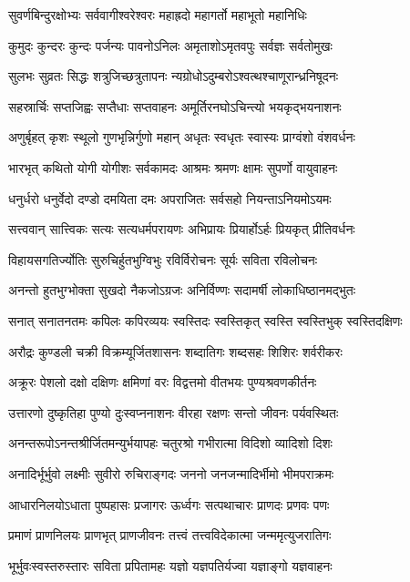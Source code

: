 \twolineshloka
{सुवर्णबिन्दुरक्षोभ्यः सर्ववागीश्वरेश्वरः}
{महाह्रदो महागर्तो महाभूतो महानिधिः}

\twolineshloka
{कुमुदः कुन्दरः कुन्दः पर्जन्यः पावनोऽनिलः}
{अमृताशोऽमृतवपुः सर्वज्ञः सर्वतोमुखः}

\twolineshloka
{सुलभः सुव्रतः सिद्धः शत्रुजिच्छत्रुतापनः}
{न्यग्रोधोऽदुम्बरोऽश्वत्थश्चाणूरान्ध्रनिषूदनः}

\twolineshloka
{सहस्रार्चिः सप्तजिह्वः सप्तैधाः सप्तवाहनः}
{अमूर्तिरनघोऽचिन्त्यो भयकृद्भयनाशनः}

\twolineshloka
{अणुर्बृहत् कृशः स्थूलो गुणभृन्निर्गुणो महान्}
{अधृतः स्वधृतः स्वास्यः प्राग्वंशो वंशवर्धनः}

\twolineshloka
{भारभृत् कथितो योगी योगीशः सर्वकामदः}
{आश्रमः श्रमणः क्षामः सुपर्णो वायुवाहनः}

\twolineshloka
{धनुर्धरो धनुर्वेदो दण्डो दमयिता दमः}
{अपराजितः सर्वसहो नियन्ताऽनियमोऽयमः}

\twolineshloka
{सत्त्ववान् सात्त्विकः सत्यः सत्यधर्मपरायणः}
{अभिप्रायः प्रियार्होऽर्हः प्रियकृत् प्रीतिवर्धनः}

\twolineshloka
{विहायसगतिर्ज्योतिः सुरुचिर्हुतभुग्विभुः}
{रविर्विरोचनः सूर्यः सविता रविलोचनः}

\twolineshloka
{अनन्तो हुतभुग्भोक्ता सुखदो नैकजोऽग्रजः}
{अनिर्विण्णः सदामर्षी लोकाधिष्ठानमद्भुतः}

\twolineshloka
{सनात् सनातनतमः कपिलः कपिरव्ययः}
{स्वस्तिदः स्वस्तिकृत् स्वस्ति स्वस्तिभुक् स्वस्तिदक्षिणः}

\twolineshloka
{अरौद्रः कुण्डली चक्री विक्रम्यूर्जितशासनः}
{शब्दातिगः शब्दसहः शिशिरः शर्वरीकरः}

\twolineshloka
{अक्रूरः पेशलो दक्षो दक्षिणः क्षमिणां वरः}
{विद्वत्तमो वीतभयः पुण्यश्रवणकीर्तनः}

\twolineshloka
{उत्तारणो दुष्कृतिहा पुण्यो दुःस्वप्ननाशनः}
{वीरहा रक्षणः सन्तो जीवनः पर्यवस्थितः}

\twolineshloka
{अनन्तरूपोऽनन्तश्रीर्जितमन्युर्भयापहः}
{चतुरश्रो गभीरात्मा विदिशो व्यादिशो दिशः}

\twolineshloka
{अनादिर्भूर्भुवो लक्ष्मीः सुवीरो रुचिराङ्गदः}
{जननो जनजन्मादिर्भीमो भीमपराक्रमः}

\twolineshloka
{आधारनिलयोऽधाता पुष्पहासः प्रजागरः}
{ऊर्ध्वगः सत्पथाचारः प्राणदः प्रणवः पणः}

\twolineshloka
{प्रमाणं प्राणनिलयः प्राणभृत् प्राणजीवनः}
{तत्त्वं तत्त्वविदेकात्मा जन्ममृत्युजरातिगः}

\twolineshloka
{भूर्भुवःस्वस्तरुस्तारः सविता प्रपितामहः}
{यज्ञो यज्ञपतिर्यज्वा यज्ञाङ्गो यज्ञवाहनः}

